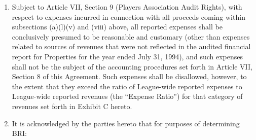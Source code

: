 \documentclass[
]{book}
\begin{document}
\begin{enumerate}
\begin{enumerate}
  \item
    Subject to Article VII, Section 9 (Players Association Audit Rights), with respect to expenses incurred in connection with all proceeds coming within subsections (a)(l)(v) and (viii) above, all reported expenses shall be conclusively presumed to be reasonable and customary (other than expenses related to sources of revenues that were not reflected in the audited financial report for Properties for the year ended July 31, 1994), and such expenses shall not be the subject of the accounting procedures set forth in Article VII, Section 8 of this Agreement. Such expenses shall be disallowed, however, to the extent that they exceed the ratio of League-wide reported expenses to League-wide reported revenues (the ``Expense Ratio'') for that category of revenues set forth in Exhibit C hereto.
  \item
    It is acknowledged by the parties hereto that for purposes of determining BRI:


\end{enumerate}
\end{enumerate}
\end{document}

